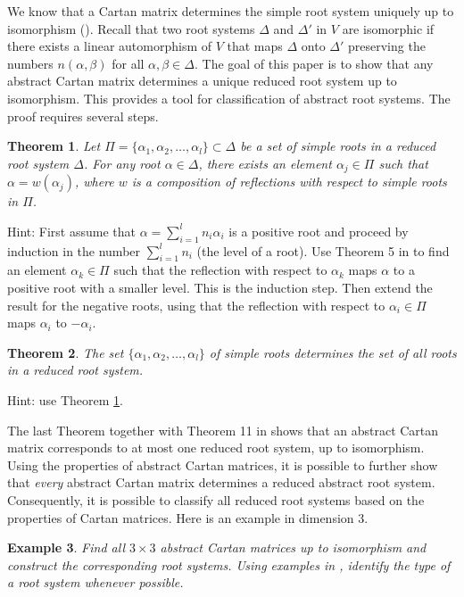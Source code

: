 \documentclass[11pt]{amsart}
\newtheorem{theorem}{Theorem}
\newtheorem{example}[theorem]{Example}
\begin{document}
We know that a  Cartan matrix determines the simple root system uniquely 
up to isomorphism (\cite{5}). 
Recall that two root systems $\Delta$ and $\Delta'$ in 
$V$ are isomorphic if there exists a linear automorphism of $V$ that 
maps $\Delta$ onto $\Delta'$ preserving the numbers $n(\alpha, \beta)$ 
for all $\alpha, \beta \in \Delta$. 
The goal of this paper is to show that any abstract Cartan matrix 
determines a unique reduced root system up to isomorphism. 
This provides a tool for classification of abstract root systems. 
The proof requires several steps. 

\begin{theorem} \label{W}
Let $\Pi = \{\alpha_1, \alpha_2, \ldots , \alpha_l \} 
\subset \Delta$ be a set of simple roots in a reduced root system 
$\Delta$. For any root $\alpha \in \Delta$, there exists an element 
$\alpha_j \in \Pi$ such that $\alpha = w(\alpha_j)$, where 
$w$ is a composition of reflections with respect to simple roots in $\Pi$. 
\end{theorem} 
Hint: First assume that $\alpha = \sum_{i=1}^l n_i \alpha_i$ 
is a positive root and proceed by induction in the number $\sum_{i=1}^l n_i$
(the level of a root). 
Use Theorem 5 in \cite{4} to find an 
element $\alpha_k \in \Pi$ such that the reflection with respect to 
$\alpha_k$ maps $\alpha$ to a positive root with a smaller 
level. This is the induction step. 
Then extend the result for the negative roots, using that 
the reflection with respect to $\alpha_i \in \Pi$ maps $\alpha_i$ to 
$-\alpha_i$. 

\begin{theorem} The set $\{\alpha_1, \alpha_2, \ldots, \alpha_l \}$ 
of simple roots determines the set of all roots in a reduced root system. 
\end{theorem} 
Hint: use Theorem \ref{W}. 

The last Theorem together with Theorem 11 in \cite{5} shows that 
an abstract Cartan matrix corresponds to at most one 
reduced root system, up to isomorphism. 
Using the properties of abstract Cartan matrices, 
it is possible to further show that \emph{every} 
abstract Cartan matrix determines a
reduced abstract root system.  Consequently, it is possible to classify 
all reduced root systems based on the properties of Cartan matrices. 
Here is an example in dimension $3$.

\begin{example} Find all $3\times3$ abstract Cartan matrices up to 
isomorphism and 
construct the corresponding root systems. Using examples in 
\cite{2,3,4,5}, identify the type of a root system whenever possible. 
\end{example} 
\end{document}
